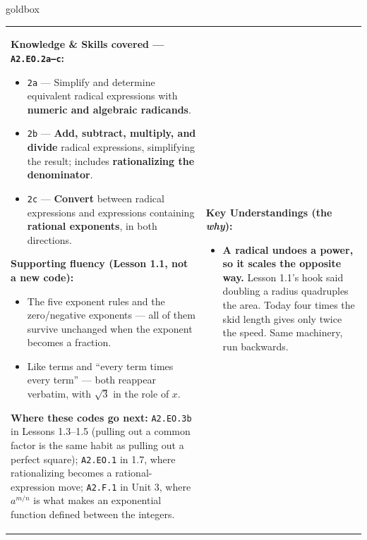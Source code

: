 \documentclass[10pt]{article}
\begin{document}
\renewcommand{\arraystretch}{1.6}
\begin{skillbox}{goldbox}
\begin{tabularx}{\linewidth}{@{}X|X@{}}
\begin{minipage}[t]{\linewidth}\vspace{0pt}
\textbf{Knowledge \& Skills covered --- \texttt{A2.EO.2a--c}:}
\begin{itemize}[leftmargin=1.1em, itemsep=2pt, topsep=2pt]
  \item \texttt{2a} --- Simplify and determine equivalent radical expressions with
        \textbf{numeric and algebraic radicands}.
  \item \texttt{2b} --- \textbf{Add, subtract, multiply, and divide} radical expressions,
        simplifying the result; includes \textbf{rationalizing the denominator}.
  \item \texttt{2c} --- \textbf{Convert} between radical expressions and expressions containing
        \textbf{rational exponents}, in both directions.
\end{itemize}
\textbf{Supporting fluency (Lesson 1.1, not a new code):}
\begin{itemize}[leftmargin=1.1em, itemsep=2pt, topsep=2pt]
  \item The five exponent rules and the zero/negative exponents --- all of them survive
        unchanged when the exponent becomes a fraction.
  \item Like terms and ``every term times every term'' --- both reappear verbatim, with
        $\sqrt3$ in the role of $x$.
\end{itemize}
\textbf{Where these codes go next:} \texttt{A2.EO.3b} in Lessons 1.3--1.5 (pulling out a common
factor is the same habit as pulling out a perfect square); \texttt{A2.EO.1} in 1.7, where
rationalizing becomes a rational-expression move; \texttt{A2.F.1} in Unit 3, where $a^{m/n}$ is
what makes an exponential function defined between the integers.
\end{minipage}
&
\begin{minipage}[t]{\linewidth}\vspace{0pt}
\textbf{Key Understandings (the \emph{why}):}
\begin{itemize}[leftmargin=1.1em, itemsep=2pt, topsep=2pt]
  \item \textbf{A radical undoes a power, so it scales the opposite way.} Lesson 1.1's hook said
        doubling a radius quadruples the area. Today four times the skid length gives only twice
        the speed. Same machinery, run backwards.

\end{itemize}
\end{minipage}
\end{tabularx}
\end{skillbox}
\end{document}
